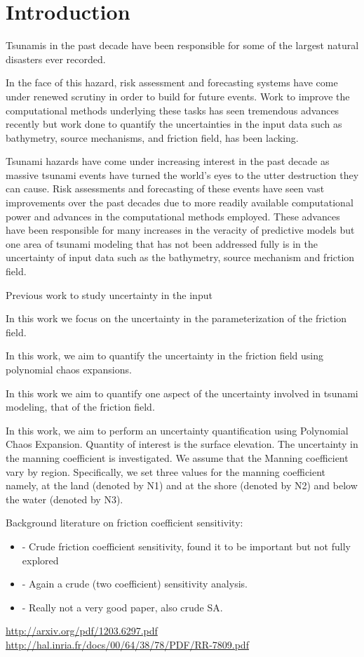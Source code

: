 
\section{Introduction} 

Tsunamis in the past decade have been responsible for some of the largest natural disasters ever recorded.  


In the face of this hazard, risk assessment and forecasting systems have come under renewed scrutiny in order to build for future events.  Work to improve the computational methods underlying these tasks has seen tremendous advances recently but work done to quantify the uncertainties in the input data such as bathymetry, source mechanisms, and friction field, has been lacking.   

Tsunami hazards have come under increasing interest in the past decade as massive tsunami events have turned the world's eyes to the utter destruction they can cause.  Risk assessments and forecasting of these events have seen vast improvements over the past decades due to more readily available computational power and advances in the computational methods employed.  These advances have been responsible for many increases in the veracity of predictive models but one area of tsunami modeling that has not been addressed fully is in the uncertainty of input data such as the bathymetry, source mechanism and friction field.

Previous work to study uncertainty in the input 

In this work we focus on the uncertainty in the parameterization of the friction field.

In this work, we aim to quantify the uncertainty in the friction field using polynomial chaos expansions.  


In this work we aim to quantify one aspect of the uncertainty involved in tsunami modeling, that of the friction field.

In this work, we aim to perform an uncertainty quantification
using Polynomial Chaos Expansion. Quantity of interest is the surface elevation.
The uncertainty in the manning coefficient is investigated.
We assume that the Manning coefficient vary by region. Specifically,
we set three values for the manning coefficient namely, at the land (denoted by N1)
and at the shore (denoted by N2) and below the water (denoted by N3).


\cite{sraj:2013a}
\cite{sraj:2013b}

Background literature on friction coefficient sensitivity:
\begin{itemize}
    \item \cite{Myers:2001el} - Crude friction coefficient sensitivity, found it to be important but not fully explored
    \item \cite{Jakeman:2010hk} - Again a crude (two coefficient) sensitivity analysis.
    \item \cite{Dao:2007hr} - Really not a very good paper, also crude SA.
\end{itemize}

\url{http://arxiv.org/pdf/1203.6297.pdf}
\url{http://hal.inria.fr/docs/00/64/38/78/PDF/RR-7809.pdf}